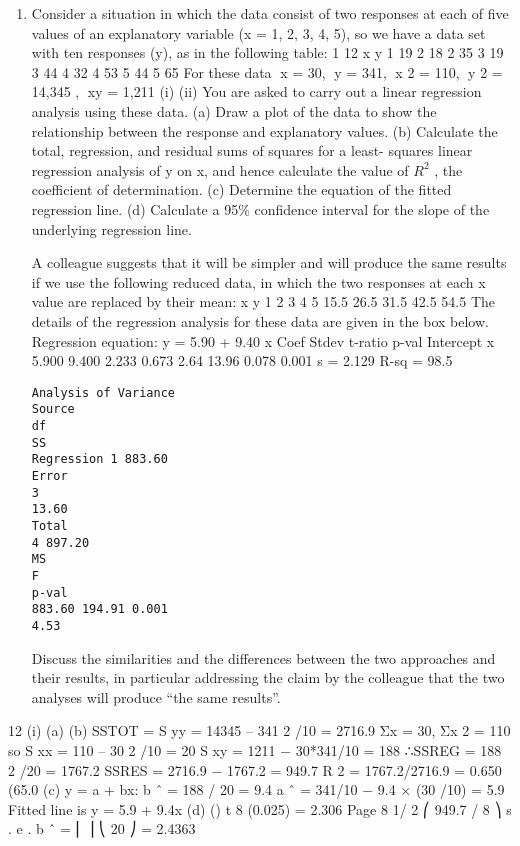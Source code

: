\documentclass[a4paper,12pt]{article}
\begin{document}
\begin{enumerate}

\item Consider a situation in which the data consist of two responses at each of five values
of an explanatory variable (x = 1, 2, 3, 4, 5), so we have a data set with ten responses
(y), as in the following table:
1
12
x
y
1
19
2
18
2
35
3
19
3
44
4
32
4
53
5
44
5
65
For these data x = 30, y = 341, x 2 = 110, y 2 = 14,345 , xy = 1,211
(i)
(ii)
You are asked to carry out a linear regression analysis using these data.
(a) Draw a plot of the data to show the relationship between the response and explanatory values.
(b) Calculate the total, regression, and residual sums of squares for a least- squares linear regression analysis of y on x, and hence calculate the value of $R^2$ , the coefficient of determination.
(c) Determine the equation of the fitted regression line.
(d) Calculate a 95\% confidence interval for the slope of the underlying regression line.

A colleague suggests that it will be simpler and will produce the same results if we use the following reduced data, in which the two responses at each x
value are replaced by their mean:
x
y
1
2
3
4
5
15.5 26.5 31.5 42.5 54.5
The details of the regression analysis for these data are given in the box below.
Regression equation: y = 5.90 + 9.40 x
Coef Stdev t-ratio p-val
Intercept
x 5.900
9.400 2.233
0.673 2.64
13.96 0.078
0.001
s = 2.129 R-sq = 98.5%
\begin{verbatim}
Analysis of Variance
Source
df
SS
Regression 1 883.60
Error
3
13.60
Total
4 897.20
MS
F
p-val
883.60 194.91 0.001
4.53
\end{verbatim}
Discuss the similarities and the differences between the two approaches and their
results, in particular addressing the claim by the colleague that the two analyses will
produce “the same results”.

\end{enumerate}
\newpage
12
(i)
(a)
(b)
SSTOT = S yy = 14345 – 341 2 /10 = 2716.9
Σx = 30, Σx 2 = 110 so S xx = 110 – 30 2 /10 = 20
S xy = 1211 − 30*341/10 = 188
∴SSREG = 188 2 /20 = 1767.2
SSRES = 2716.9 − 1767.2 = 949.7
R 2 = 1767.2/2716.9 = 0.650 (65.0%
(c)
y = a + bx:
b ˆ = 188 / 20 = 9.4
a ˆ = 341/10 − 9.4 × (30 /10) = 5.9
Fitted line is y = 5.9 + 9.4x
(d)
()
t 8 (0.025) = 2.306
Page 8
1/ 2
⎛ 949.7 / 8 ⎞
s . e . b ˆ = ⎜
⎟
⎝ 20 ⎠
= 2.4363
\end{document}
